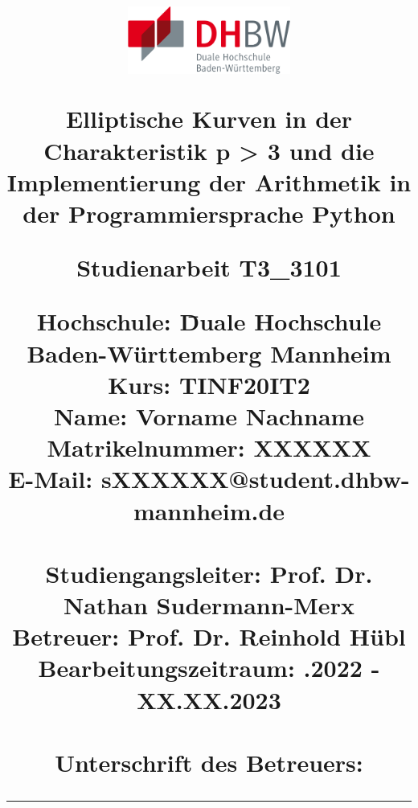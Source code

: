 \begin{titlepage}
\centering
\title{		
	\includegraphics[width=0.4\textwidth]{grafiken/dhbw.png}\\       		 
	\vspace{1.0cm}
          
    \begin{singlespacing}
    {\Large Elliptische Kurven in der Charakteristik p > 3 und die Implementierung der Arithmetik in der Programmiersprache Python}	\\
    \vspace{1.8cm}	
    \begin{normalfont}
	{\large Studienarbeit T3\_3101}
	\end{normalfont}
    \vspace{1.8cm}
    \begin{onehalfspacing}
    \begin{normalsize}
	\begin{normalfont}
	\begin{tabbing}
	Hochschule: \hspace{2.7cm} \= Duale Hochschule Baden-Württemberg Mannheim\\
	Kurs: \> TINF20IT2\\	
	Name: \> Vorname Nachname\\
	Matrikelnummer: \> XXXXXX\\	
	E-Mail: \> sXXXXXX@student.dhbw-mannheim.de\\			
	\vspace{1.0cm}\\
	Studiengangsleiter:  \> Prof. Dr. Nathan Sudermann-Merx\\
	Betreuer: \> Prof. Dr. Reinhold Hübl\\	
	Bearbeitungszeitraum: .2022 - XX.XX.2023\\	
	\vspace{1.0cm}\\
	Unterschrift des Betreuers: \> {\rule{6cm}{1pt}}\\
	\end{tabbing}
	\end{normalfont}
	\end{normalsize}
	\end{onehalfspacing}
	\end{singlespacing}	
}
\author{}
\date{} 
\maketitle		
\end{titlepage}